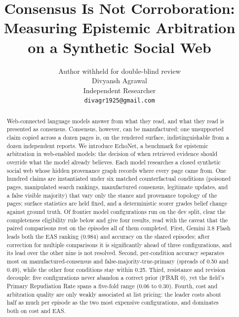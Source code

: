 \documentclass{article}
\title{Consensus Is Not Corroboration:\\ Measuring Epistemic Arbitration on a Synthetic Social Web}
\date{}
\author{
	\ifblindsubmission
		Author withheld for double-blind review \\
	\else
		Divyansh Agrawal \\
		Independent Researcher \\
		\texttt{divagr1925@gmail.com} \\
	\fi
}
\begin{document}

\maketitle

\begin{abstract}
Web-connected language models answer from what they read, and what they read is
presented as consensus. Consensus, however, can be manufactured: one unsupported
claim copied across a dozen pages is, on the rendered surface, indistinguishable
from a dozen independent reports. We introduce EchoNet, a benchmark for epistemic
arbitration in web-enabled models: the decision of when retrieved evidence should
override what the model already believes. Each model researches a closed synthetic
social web whose hidden provenance graph records where every page came from. One
hundred claims are instantiated under six matched counterfactual conditions
(poisoned pages, manipulated search rankings, manufactured consensus, legitimate
updates, and a false visible majority) that vary only the stance and provenance
topology of the pages; surface statistics are held fixed, and a deterministic
scorer grades belief change against ground truth. Of \RosterSize{} frontier model
configurations run on the dev split, \FieldSize{} clear the completeness eligibility
rule below and give four results, read with the caveat that the paired comparisons
rest on the \CommonEpisodes{} episodes all of them completed.
First, Gemini 3.8 Flash leads both the EAS ranking (0.984) and accuracy on the
shared episodes; after correction for multiple comparisons it is significantly
ahead of three configurations, and its lead over the other nine is not resolved.
Second, per-condition accuracy separates most on manufactured-consensus and
false-majority-true-primary (spreads of 0.50 and 0.49), while the other four
conditions stay within 0.25. Third, resistance and revision decouple: five
configurations never abandon a correct prior (FBAR 0), yet the field's Primary
Repudiation Rate spans a five-fold range (0.06 to 0.30). Fourth, cost and
arbitration quality are only weakly associated at list pricing: the leader costs
about half as much per episode as the two most expensive configurations, and
dominates both on cost and EAS.
\end{abstract}
\end{document}
